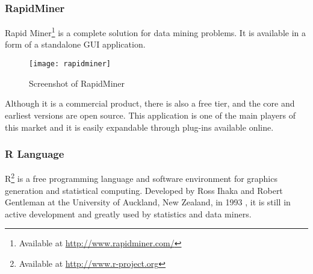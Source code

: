 


\subsubsection{RapidMiner}

Rapid Miner\footnote{ Available at \url{http://www.rapidminer.com/}} is a
complete solution for data mining problems. It is available in a form of a
standalone GUI application. \begin{figure}[h] \begin{center} \leavevmode
  \texttt{[image: rapidminer]} \caption{Screenshot of
RapidMiner \protect\footnotemark} \label{fig:RapidMiner} \end{center}
\end{figure} 
Although it is a commercial product, there is also a free tier, and the core and
earliest versions are open source. This application is one of the main players
of this market and it is easily expandable through plug-ins available online.

\subsubsection{R Language} R\footnote{ Available at
\url{http://www.r-project.org}} is a free programming language and software
environment for graphics generation and statistical computing. Developed by Ross
Ihaka and Robert Gentleman at the University of Auckland, New Zealand, in 1993
\cite{Ihaka98r:past}, it is still in active development and greatly used by
statistics and data miners.

